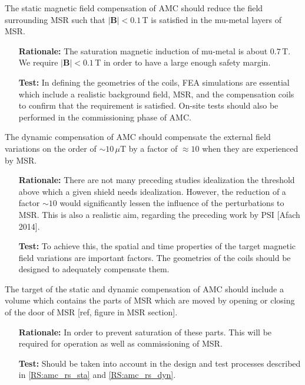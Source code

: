 \begin{RSenumerate}[resume]
\item    The static magnetic field compensation of AMC should reduce the field surrounding MSR such that  $|\mathbf{B}|<0.1\,$T is satisfied in the mu-metal layers of MSR. \label{RS:amc_rs_sta}
\begin{itemize}
    \item[\textbf{Rationale:}]  The saturation magnetic induction of mu-metal is about $ 0.7\,$T. We require $|\mathbf{B}|<0.1\,$T  in order to have a large enough safety margin.
    \item[\textbf{Test:}] In defining the geometries of the coils, FEA simulations are essential which include a realistic background field, MSR, and the compensation coils to confirm that the requirement is satisfied. On-site tests should also be performed in the commissioning phase of AMC.
\end{itemize}

 \item The dynamic compensation of AMC should compensate the external field variations on the  order of $\sim 10\,\mu$T by a factor of $\approx 10$ when they are experienced by MSR. \label{RS:amc_rs_dyn}
 \begin{itemize}
    \item[\textbf{Rationale:}] 
    There are not many preceding studies idealization the threshold above which  a given shield needs idealization. However, the reduction of a factor $\sim 10$ would significantly lessen the influence of the perturbations to MSR. This is also a realistic aim, regarding the preceding work by PSI [Afach 2014]. 
    \item[\textbf{Test:}] 
    To achieve this, the spatial and time properties of the target magnetic field variations are important factors. The geometries of the coils should be designed to adequately compensate them.
\end{itemize}

  \item The target of the static and dynamic compensation of AMC should include  a  volume which contains the parts of MSR which are moved by opening or closing of the door of MSR [ref, figure in MSR section]\label{RS:amc_rs_volume}.
 \begin{itemize}
    \item[\textbf{Rationale:}] In order to prevent saturation of these parts.  This will be required for operation as well as commissioning of MSR. 
    \item[\textbf{Test:}] Should be taken into account in the design and test processes described in \ref{RS:amc_rs_sta} and \ref{RS:amc_rs_dyn}.
\end{itemize}
\end{RSenumerate}

